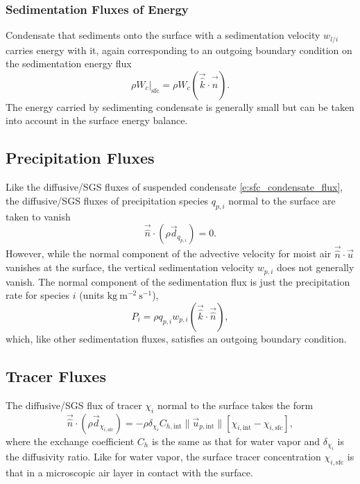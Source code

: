 \documentclass{report}
\begin{document}
\subsubsection{Sedimentation Fluxes of Energy}

Condensate that sediments onto the surface with a sedimentation velocity $w_{l/i}$ carries energy with it, again corresponding to an outgoing boundary condition on the sedimentation energy flux
\[
\left. \rho W_c\right|_\mathrm{sfc} = \rho W_c (\vec{\hat k} \cdot \vec{\hat n}).
\]
The energy carried by sedimenting condensate is generally small but can be taken into account in the surface energy balance.

\subsection{Precipitation Fluxes}

Like the diffusive/SGS fluxes of suspended condensate \eqref{e:sfc_condensate_flux}, the diffusive/SGS fluxes of precipitation species $q_{p, i}$ normal to the surface are taken to vanish
\begin{equation}\label{e:sfc_precip}
 \vec{\hat n} \cdot (\rho \vec{d}_{q_{p, i}}) = 0.
\end{equation} 
However, while the normal component of the advective velocity for moist air $\vec{\hat n} \cdot \vec{u}$ vanishes at the surface, the vertical sedimentation velocity $w_{p,i}$ does not generally vanish. The normal component of the sedimentation flux is just the precipitation rate for species $i$ (units $\mathrm{kg~m^{-2}~s^{-1}}$),
\begin{equation}
    P_i = \rho q_{p, i} w_{p, i} (\vec{\hat k} \cdot \vec{\hat n}),
\end{equation}
which, like other sedimentation fluxes, satisfies an outgoing boundary condition. 

\subsection{Tracer Fluxes}

The diffusive/SGS flux of tracer $\chi_i$ normal to the surface takes the form 
\begin{equation}\label{e:sfc_tracer}
 \vec{\hat n} \cdot (\rho \vec{d}_{\chi_{i, \mathrm{sfc}}}) = - \rho \delta_{\chi_i} C_{h, \mathrm{int}} \| \vec{u}_{p, \mathrm{int}} \| \left[\chi_{i, \mathrm{int}} - \chi_{i, \mathrm{sfc}} \right],
\end{equation} 
where the exchange coefficient $C_h$ is the same as that for water vapor and $\delta_{\chi_i}$ is the diffusivity ratio. Like for water vapor, the surface tracer concentration $\chi_{i, \mathrm{sfc}}$ is that in a microscopic air layer in contact with the surface.
\end{document}
